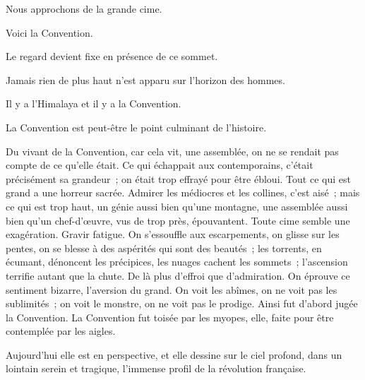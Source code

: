\documentclass[french,twoside]{book} %
\def\mednobreak{\ifdim\lastskip<\medskipamount
  \removelastskip\nopagebreak\medskip\fi}
\newcommand{\labelblock}[1]{\medbreak{\noindent\color{rubric}\bfseries #1}\par\mednobreak}
\begin{document}
\labelblock{i}

\noindent Nous approchons de la grande cime.\par
Voici la Convention.\par
Le regard devient fixe en présence de ce sommet.\par
Jamais rien de plus haut n’est apparu sur l’horizon des hommes.\par
Il y a l’Himalaya et il y a la Convention.\par
La Convention est peut-être le point culminant de l’histoire.\par
Du vivant de la Convention, car cela vit, une assemblée, on ne se rendait pas compte de ce qu’elle était. Ce qui échappait aux contemporains, c’était précisément sa grandeur ; on était trop effrayé pour être ébloui. Tout ce qui est grand a une horreur sacrée. Admirer les médiocres et les collines, c’est  aisé ; mais ce qui est trop haut, un génie aussi bien qu’une montagne, une assemblée aussi bien qu’un chef-d’œuvre, vus de trop près, épouvantent. Toute cime semble une exagération. Gravir fatigue. On s’essouffle aux escarpements, on glisse sur les pentes, on se blesse à des aspérités qui sont des beautés ; les torrents, en écumant, dénoncent les précipices, les nuages cachent les sommets ; l’ascension terrifie autant que la chute. De là plus d’effroi que d’admiration. On éprouve ce sentiment bizarre, l’aversion du grand. On voit les abîmes, on ne voit pas les sublimités ; on voit le monstre, on ne voit pas le prodige. Ainsi fut d’abord jugée la Convention. La Convention fut toisée par les myopes, elle, faite pour être contemplée par les aigles.\par
Aujourd’hui elle est en perspective, et elle dessine sur le ciel profond, dans un lointain serein et tragique, l’immense profil de la révolution française.\par

\labelblock{ii}
\end{document}

